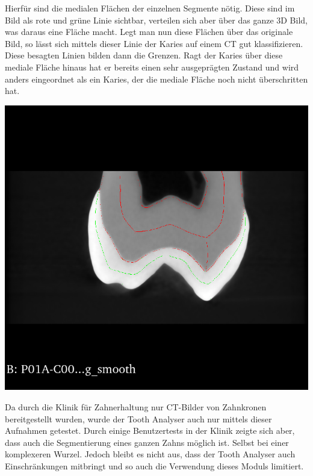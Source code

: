 \begin{minipage}{0.45\textwidth}
	Hierfür sind die medialen Flächen der einzelnen Segmente nötig. Diese sind im
	Bild als rote und grüne Linie sichtbar, verteilen sich aber über das ganze 3D Bild,
	was daraus eine Fläche macht. Legt man nun diese Flächen über das originale Bild,
	so lässt sich mittels dieser Linie der Karies auf einem \ac{CT} gut klassifizieren.
	Diese besagten Linien bilden dann die Grenzen. Ragt der Karies über diese mediale
	Fläche hinaus hat er bereits einen sehr ausgeprägten Zustand und wird anders eingeordnet
	als ein Karies, der die mediale Fläche noch nicht überschritten hat.
\end{minipage}
\hfill
\begin{minipage}{0.45\textwidth}
	\centering
	\includegraphics[scale=0.2, width=\textwidth]{img/classification.png}
	 \label{fig:classification}
\end{minipage}

Da durch die Klinik für Zahnerhaltung nur \ac{CT}-Bilder von Zahnkronen
bereitgestellt wurden, wurde der Tooth Analyser auch nur mittels dieser Aufnahmen
getestet. Durch einige Benutzertests in der Klinik zeigte sich aber, dass auch die
Segmentierung eines ganzen Zahns möglich ist. Selbst bei einer komplexeren
Wurzel. Jedoch bleibt es nicht aus, dass der Tooth Analyser auch Einschränkungen
mitbringt und so auch die Verwendung dieses Moduls limitiert.

